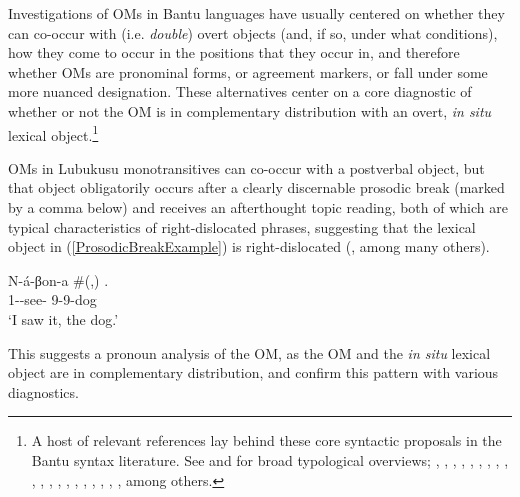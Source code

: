 \documentclass[output=paper]{langscibook}
\begin{document}
\noindent Investigations of OMs in Bantu languages have usually centered on whether they can co-occur with (i.e. \textit{double}) overt objects (and, if so, under what conditions),  how they come to occur in the positions that they occur in, and therefore whether OMs are pronominal forms, or agreement markers, or fall under some more nuanced designation. These alternatives center on a core diagnostic of whether or not the OM is in complementary distribution with an overt, \textit{in situ} lexical object.\footnote{A host of relevant references lay behind these core syntactic proposals in the Bantu syntax literature. See \citet{MartenKula:2012:BantuOmParameters} and \citet{MartenKulaThwala:2007:BantuParameters} for broad typological overviews; \citet{BresnanMchombo:1987:ChichewaSmOm}, \citet{Jelinek:1984:IncorporatePronouns}, \citet{Baker:2003:KinandeAgrDislocate}, \citet{VanDerSpuy:1993:NguniOm}, \citet{Zeller:2009:ZuluClld}, \citet{Zerbian:2006:Thesis}, \citet{ByarushengoHymanTenenbaum:1976:Haya}, \citet{Marlo:2014:ExceptionalOmsBantu}, \citet{Marlo:2015:ExceptionalReflexive,Marlo:2015:NumberOfOms}, \citet{DurantiByarushengo:1977:HayaDirectObject}, \citet{Tenenbaum:1977:HayaDislocation}, \citet{Riedel:2009:Thesis}, \citet{Henderson:2006:Thesis}, \citet{Zeller:2012:ZuluOM,Zeller:2015:ZuluDrD,Zeller:2014:ZuluOm3Types}, \citet{Letsholo:2013:IkalangaOM}, \citet{MartenRamadhani:2001:KiluguruOM}, \citet{Keach:1995:SwahiliSmOm}, \citet{Woolford:2001:RuwundOm}, \citet{BaxDiercks:2012:ManyikaOm}, \citet{DiercksRaneroPaster:2014:KuriaClitic}, among others.}

OMs in Lubukusu monotransitives can co-occur with a postverbal object, but that object obligatorily occurs after a clearly discernable prosodic break (marked by a comma below) and receives an afterthought topic reading, both of which are typical characteristics of right-dislocated phrases, suggesting that the lexical object in (\ref{ProsodicBreakExample}) is right-dislocated (\citealt{Riedel:2009:Thesis}, among many others). 

\ea \label{ProsodicBreakExample}
\gll N-á-βon-a \#(,) . \\
1\Sm-\Om-see-\Fv{} {} 9-9-dog \\ %
\glt `I saw it, the dog.' \citep[366]{SikukuEtAl:2018:LubukusuOM}
\z 

This suggests a pronoun analysis of the OM, as the OM and the \textit{in situ} lexical object are in complementary distribution, and \citet{SikukuEtAl:2018:LubukusuOM} confirm this pattern with various diagnostics.
\end{document}
